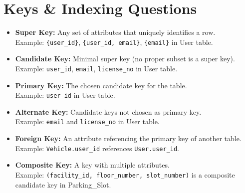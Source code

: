 \documentclass[12pt,a4paper]{article}
\begin{document}
\section{Keys \& Indexing Questions}

\begin{questionbox}
\end{questionbox}
\begin{answerbox}
\begin{itemize}[nosep]
    \item \textbf{Super Key:} Any set of attributes that uniquely identifies a row.\\
    Example: \texttt{\{user\_id\}}, \texttt{\{user\_id, email\}}, \texttt{\{email\}} in User table.

    \item \textbf{Candidate Key:} Minimal super key (no proper subset is a super key).\\
    Example: \texttt{user\_id}, \texttt{email}, \texttt{license\_no} in User table.

    \item \textbf{Primary Key:} The chosen candidate key for the table.\\
    Example: \texttt{user\_id} in User table.

    \item \textbf{Alternate Key:} Candidate keys not chosen as primary key.\\
    Example: \texttt{email} and \texttt{license\_no} in User table.

    \item \textbf{Foreign Key:} An attribute referencing the primary key of another table.\\
    Example: \texttt{Vehicle.user\_id} references \texttt{User.user\_id}.

    \item \textbf{Composite Key:} A key with multiple attributes.\\
    Example: \texttt{(facility\_id, floor\_number, slot\_number)} is a composite candidate key in Parking\_Slot.
\end{itemize}
\end{answerbox}
\end{document}
